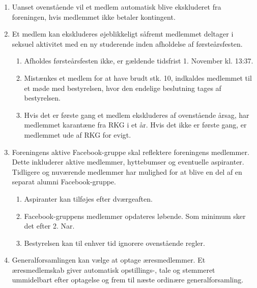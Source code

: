 \documentclass[a4paper, 10pt]{article}
\renewcommand\thesection{\textsection\arabic{section}}
\newenvironment{stykenum}{
  \begin{enumerate}[%
    label=Stk.~\arabic*:, ref=\thesection~Stk.~\arabic{enumi}, start=1]
}{\end{enumerate}}
\newenvironment{substykenum}{
  \begin{enumerate}[%
          label=Stk.~\arabic{enumi}.\arabic*:,
      ref=\thesection~Stk.~\arabic{enumi}.\arabic*, start=1]
}{\end{enumerate}}
\begin{document}
\begin{stykenum}
    \item Uanset ovenstående vil et medlem automatisk blive ekskluderet fra
        foreningen, hvis medlemmet ikke betaler kontingent.

    \item Et medlem kan ekskluderes øjeblikkeligt såfremt medlemmet deltager i
        seksuel aktivitet med en ny studerende inden afholdelse af
        førsteårsfesten.
        \begin{substykenum}
            \item Afholdes førsteårsfesten ikke, er gældende tidsfrist 1.
                November kl. 13:37.

            \item Mistænkes et medlem for at have brudt stk. 10, indkaldes
                medlemmet til et møde med bestyrelsen, hvor den endelige
                beslutning tages af bestyrelsen.

            \item Hvis det er første gang et medlem ekskluderes af ovenstående
                årsag, har medlemmet karantæne fra RKG i et år. Hvis det ikke er
                første gang, er medlemmet ude af RKG for evigt.
        \end{substykenum}

    \item Foreningens aktive Facebook-gruppe skal reflektere foreningens medlemmer. Dette inkluderer aktive medlemmer, hyttebumser og eventuelle aspiranter. Tidligere og nuværende medlemmer har mulighed for at blive en del af en separat alumni Facebook-gruppe.
        \begin{substykenum}
            \item Aspiranter kan tilføjes efter dværgeaften.

            \item Facebook-gruppens medlemmer opdateres løbende. Som minimum
                sker det efter 2. Nar.

            \item Bestyrelsen kan til enhver tid ignorere ovenstående
                regler.

        \end{substykenum}

    \item \label{aeresmedlemmer} Generalforsamlingen kan vælge at optage
      æresmedlemmer. Et æresmedlemskab giver automatisk opstillings-, tale og
      stemmeret ummidelbart efter optagelse og frem til næste ordinære
      generalforsamling.
\end{stykenum}
\end{document}
